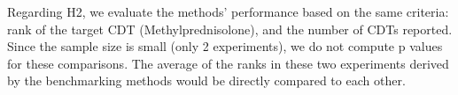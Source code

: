 Regarding H2, we evaluate the methods' performance based on the same criteria: rank of the target CDT (Methylprednisolone), and the number of CDTs reported. 
Since the sample size is small (only 2 experiments), we do not compute p values for these comparisons. The average of the ranks in these two experiments derived by the benchmarking methods would be directly compared to each other.




